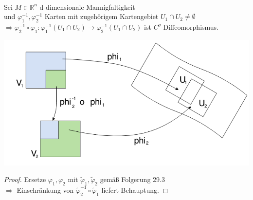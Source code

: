 \begin{lemma}[Kartenwechsel] 
\mbox{} \\
Sei $M \in \mathbb{R}^n $ d-dimensionale Mannigfaltigkeit \\
und $\varphi_1^{-1}, \varphi_2^{-1} $ Karten mit zugehörigem Kartengebiet 
$U_1 \cap U_2 \neq \emptyset $ \\
$\Longrightarrow 
\varphi_2^{-1} \circ \varphi_1 : \varphi_1^{-1} \left( U_1 \cap U_2 \right)
\rightarrow \varphi_2^{-1} \left( U_1 \cap U_2 \right) $ ist $C^q$-Diffeomorphismus.\\
\begin{center}
\includegraphics[scale=0.5]{pictures/002-03}\\
\end{center}
\end{lemma}

\begin{proof}
Ersetze $\varphi_1, \varphi_2 $ mit $\tilde{\varphi}_1, \tilde{\varphi}_2 $
gemäß Folgerung 29.3 \\
$\Rightarrow$ Einschränkung von $\tilde{\varphi}_2^{-1} \circ \tilde{\varphi}_1 $
liefert Behauptung. 
\end{proof}

